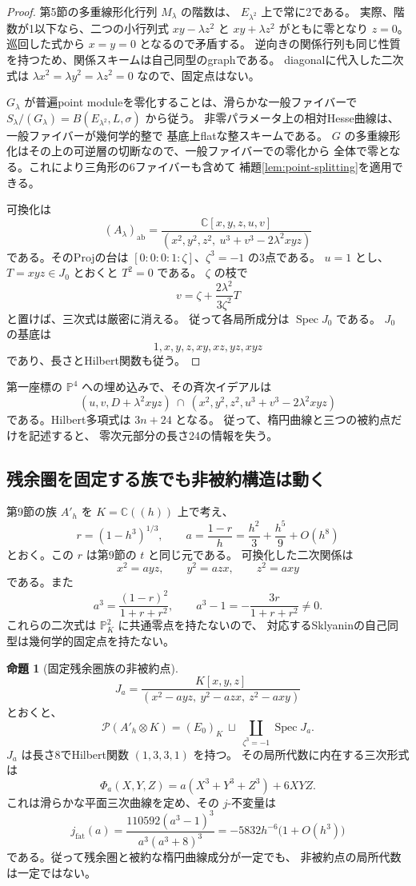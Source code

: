 \documentclass[a4paper,11pt]{ltjsarticle}
\newcommand{\mathscr}{\mathcal}
\theoremstyle{definition}
\newtheorem{theorem}{命題}[section]
\newcommand{\CC}{\mathbb C}
\newcommand{\PP}{\mathbb P}
\begin{document}
\begin{proof}
第5節の多重線形化行列 $M_\lambda$ の階数は、
$E_{\lambda^2}$ 上で常に2である。
実際、階数が1以下なら、二つの小行列式
$xy-\lambda z^2$ と $xy+\lambda z^2$ がともに零となり $z=0$。
巡回した式から $x=y=0$ となるので矛盾する。
逆向きの関係行列も同じ性質を持つため、関係スキームは自己同型のgraphである。
diagonalに代入した二次式は
$\lambda x^2=\lambda y^2=\lambda z^2=0$ なので、固定点はない。

$G_\lambda$ が普遍point moduleを零化することは、滑らかな一般ファイバーで
$S_\lambda/(G_\lambda)=B(E_{\lambda^2},L,\sigma)$ から従う。
非零パラメータ上の相対Hesse曲線は、一般ファイバーが幾何学的整で
基底上flatな整スキームである。
$G$ の多重線形化はその上の可逆層の切断なので、一般ファイバーでの零化から
全体で零となる。これにより三角形の6ファイバーも含めて
補題\ref{lem:point-splitting}を適用できる。

可換化は
\[
 (A_\lambda)_{\mathrm{ab}}=
 \frac{\CC[x,y,z,u,v]}
 {(x^2,y^2,z^2,\ u^3+v^3-2\lambda^2xyz)}
\]
である。そのProjの台は $[0:0:0:1:\zeta]$、$\zeta^3=-1$ の3点である。
$u=1$ とし、$T=xyz\in J_0$ とおくと $T^2=0$ である。
$\zeta$ の枝で
\[
 v=\zeta+\frac{2\lambda^2}{3\zeta^2}T
\]
と置けば、三次式は厳密に消える。
従って各局所成分は $\operatorname{Spec}J_0$ である。
$J_0$ の基底は
\[
 1,x,y,z,xy,xz,yz,xyz
\]
であり、長さとHilbert関数も従う。
\end{proof}

第一座標の $\PP^4$ への埋め込みで、その斉次イデアルは
\[
 (u,v,D+\lambda^2xyz)\ \cap\
 (x^2,y^2,z^2,u^3+v^3-2\lambda^2xyz)
\]
である。Hilbert多項式は $3n+24$ となる。
従って、楕円曲線と三つの被約点だけを記述すると、
零次元部分の長さ24の情報を失う。

\subsection{残余圏を固定する族でも非被約構造は動く}

第9節の族 $A'_h$ を $K=\CC((h))$ 上で考え、
\[
 r=(1-h^3)^{1/3},\qquad
 a=\frac{1-r}{h}=\frac{h^2}{3}+\frac{h^5}{9}+O(h^8)
\]
とおく。この $r$ は第9節の $t$ と同じ元である。
可換化した二次関係は
\[
 x^2=a yz,\qquad y^2=a zx,\qquad z^2=a xy
\]
である。また
\[
 a^3=\frac{(1-r)^2}{1+r+r^2},\qquad
 a^3-1=-\frac{3r}{1+r+r^2}\ne0.
\]
これらの二次式は $\PP^2_K$ に共通零点を持たないので、
対応するSklyaninの自己同型は幾何学的固定点を持たない。

\begin{theorem}[固定残余圏族の非被約点]\label{thm:fixed-points}
\[
 J_a=
 \frac{K[x,y,z]}
 {(x^2-a yz,\ y^2-a zx,\ z^2-a xy)}
\]
とおくと、
\[
 \mathscr P(A'_h\otimes K)
 =(E_0)_K\ \sqcup\
 \coprod_{\zeta^3=-1}\operatorname{Spec}J_a.
\]
$J_a$ は長さ8でHilbert関数 $(1,3,3,1)$ を持つ。
その局所代数に内在する三次形式は
\[
 \Phi_a(X,Y,Z)=a(X^3+Y^3+Z^3)+6XYZ.
\]
これは滑らかな平面三次曲線を定め、その $j$-不変量は
\begin{equation}\label{eq:fat-j}
 j_{\mathrm{fat}}(a)
 =\frac{110592(a^3-1)^3}{a^3(a^3+8)^3}
 =-5832h^{-6}\bigl(1+O(h^3)\bigr)
\end{equation}
である。従って残余圏と被約な楕円曲線成分が一定でも、
非被約点の局所代数は一定ではない。
\end{theorem}
\end{document}
